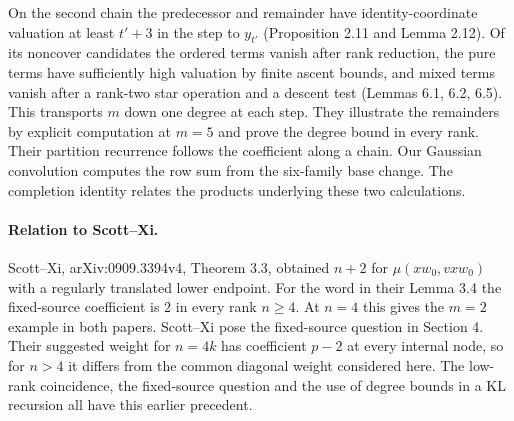 On the second chain the predecessor and remainder have identity-coordinate valuation at least \(t'+3\) in the step to \(y_{t'}\) (Proposition 2.11 and Lemma 2.12). Of its noncover candidates the ordered terms vanish after rank reduction, the pure terms have sufficiently high valuation by finite ascent bounds, and mixed terms vanish after a rank-two star operation and a descent test (Lemmas 6.1, 6.2, 6.5). This transports \(m\) down one degree at each step. They illustrate the remainders by explicit computation at \(m=5\) and prove the degree bound in every rank. Their partition recurrence follows the coefficient along a chain. Our
Gaussian convolution computes the row sum from the six-family base change.
The completion identity relates the products underlying these two calculations.

\paragraph{Relation to Scott--Xi.}
Scott--Xi, arXiv:0909.3394v4, Theorem 3.3, obtained \(n+2\) for \(\mu(xw_0,vxw_0)\) with a regularly translated lower endpoint. For the word in their Lemma 3.4 the fixed-source coefficient is \(2\) in every rank \(n\ge4\). At \(n=4\) this gives the \(m=2\) example in both papers. Scott--Xi pose the fixed-source question in Section 4. Their suggested weight for \(n=4k\) has coefficient \(p-2\) at every internal node, so for \(n>4\) it differs from the common diagonal weight considered here. The low-rank coincidence, the fixed-source question and the use of degree bounds in a KL recursion all have this earlier precedent.
